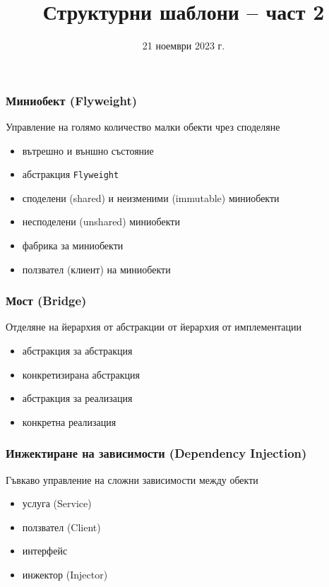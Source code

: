 \documentclass[alsotrans]{beamerswitch}
\title{Структурни шаблони -- част 2}
\date{21 ноември 2023 г.}
\begin{document}
\begin{frame}
  \titlepage
\end{frame}

\begin{frame}
  \frametitle{Миниобект (Flyweight)}

  \begin{purpose}
    Управление на голямо количество малки обекти чрез споделяне
  \end{purpose}

  \pause
  \vspace{2ex}
  \comps
  \begin{itemize}[<+->]
  \item вътрешно и външно състояние
  \item абстракция \tt{Flyweight}
  \item споделени (shared) и неизменими (immutable) миниобекти
  \item несподелени (unshared) миниобекти
  \item фабрика за миниобекти
  \item ползвател (клиент) на миниобекти
  \end{itemize}
\end{frame}

\begin{frame}
  \frametitle{Мост (Bridge)}

  \begin{purpose}
    Отделяне на йерархия от абстракции от йерархия от имплементации
  \end{purpose}

  \pause
  \vspace{2ex}
  \comps
  \begin{itemize}[<+->]
  \item абстракция за абстракция
  \item конкретизирана абстракция
  \item абстракция за реализация
  \item конкретна реализация
  \end{itemize}
\end{frame}

\begin{frame}
  \frametitle{Инжектиране на зависимости (Dependency Injection)}

  \begin{purpose}
    Гъвкаво управление на сложни зависимости между обекти
  \end{purpose}

  \pause
  \vspace{2ex}
  \comps
  \begin{itemize}[<+->]
  \item услуга (Service)
  \item ползвател (Client)
  \item интерфейс
  \item инжектор (Injector)
  \end{itemize}
\end{frame}
\end{document}
